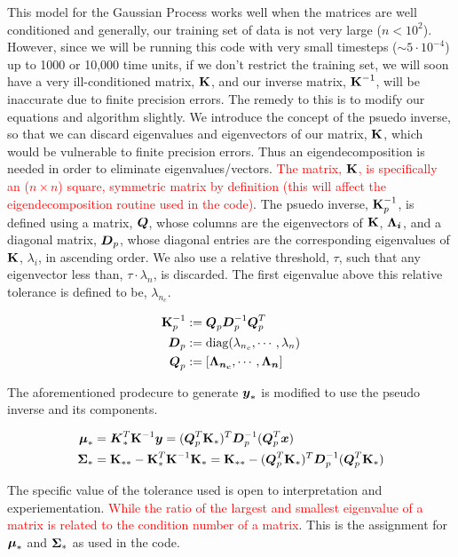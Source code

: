 \documentclass{article}
\begin{document}
This model for the Gaussian Process works well when the matrices are well conditioned and generally, our training set of data is not very large ($n < 10^2$). However, since we will be running this code with very small timesteps ($\sim 5\cdot10^{-4}$) up to 1000 or 10,000 time units, if we don't restrict the training set, we will soon have a very ill-conditioned matrix, $\boldsymbol{\mathrm{K}}$, and our inverse matrix, $\boldsymbol{\mathrm{K}}^{-1}$, will be inaccurate due to finite precision errors. 
The remedy to this is to modify our equations and algorithm slightly. We introduce the concept of the psuedo inverse, so that we can discard eigenvalues and eigenvectors of our matrix, $\boldsymbol{\mathrm{K}}$, which would be vulnerable to finite precision errors. Thus an eigendecomposition is needed in order to eliminate eigenvalues/vectors. \textcolor{red}{The matrix, $\boldsymbol{\mathrm{K}}$, is specifically an ($n \times n$)  square, symmetric matrix by definition (this will affect the eigendecomposition routine used in the code)}. The psuedo inverse, $\boldsymbol{\mathrm{K}}_p^{-1}$, is defined using a matrix, $\boldsymbol{Q}$, whose columns are the eigenvectors of $\boldsymbol{\mathrm{K}}$, $\boldsymbol{\Lambda_i}$, and a diagonal matrix, $\boldsymbol{D}_p$, whose diagonal entries are the corresponding eigenvalues of $\boldsymbol{\mathrm{K}}$, $\lambda_i$, in ascending order. We also use a relative threshold, $\tau$, such that any eigenvector less than, $\tau \cdot \lambda_n$, is discarded. The first eigenvalue above this relative tolerance is defined to be, $\lambda_{n_c}$. 

\begin{align*}
    \boldsymbol{\mathrm{K}}_p^{-1} &:= \boldsymbol{Q}_p \boldsymbol{D}_p^{-1} \boldsymbol{Q}_p^{T} \\
    \boldsymbol{D}_p &:= \text{diag}(\lambda_{n_c}, \cdots, \lambda_{n}) \\  
    \boldsymbol{Q}_p &:= \left[\boldsymbol{\Lambda_{n_c}}, \cdots, \boldsymbol{\Lambda_{n}}\right]   
   \end{align*}
\emp

The aforementioned prodecure to generate $\boldsymbol{y}_*$ is modified to use the pseudo inverse and its components. 

\begin{align*}
    \boldsymbol{\mu}_*  &=  \boldsymbol{K}_*^T\boldsymbol{\mathrm{K}}^{-1}\boldsymbol{y}  
                = (\boldsymbol{Q}_p^T\boldsymbol{\mathrm{K}}_*)^T\boldsymbol{D}_p^{-1}(\boldsymbol{Q}_p^T\boldsymbol{x}) \\
    \boldsymbol{\Sigma}_* &= \boldsymbol{\mathrm{K}}_{**} - \boldsymbol{\mathrm{K}}_*^T\boldsymbol{\mathrm{K}}^{-1}\boldsymbol{\mathrm{K}}_* 
                = \boldsymbol{\mathrm{K}}_{**} - (\boldsymbol{Q}_p^T\boldsymbol{\mathrm{K}}_*)^T\boldsymbol{D}_p^{-1}(\boldsymbol{Q}_p^T\boldsymbol{\mathrm{K}}_*) 
\end{align*}
\emp

The specific value of the tolerance used is open to interpretation and experiementation. \textcolor{red}{While the ratio of the largest and smallest eigenvalue of a matrix is related to the condition number of a matrix}. This is the assignment for $\boldsymbol{\mu}_*$ and $\boldsymbol{\Sigma}_*$ as used in the code. 
\end{document}
